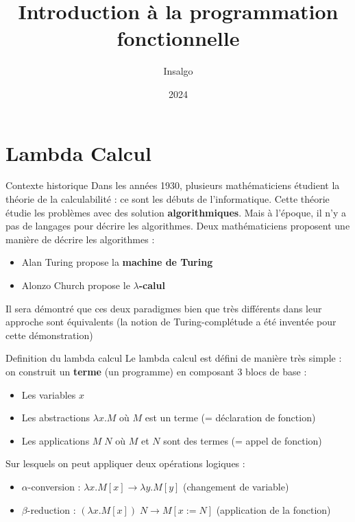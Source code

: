 \documentclass[aspectratio=169]{beamer}
\title{Introduction à la programmation fonctionnelle}
\author{Insalgo}
\date{2024}
\begin{document}
\frame{\titlepage}

\frame{\tableofcontents}

\section{Lambda Calcul}

\begin{frame}{Contexte historique}
    Dans les années 1930, plusieurs mathématiciens étudient la théorie de la calculabilité : ce sont les débuts de l'informatique. Cette théorie étudie les problèmes avec des solution \textbf{algorithmiques}.
    Mais à l'époque, il n'y a pas de langages pour décrire les algorithmes. Deux mathématiciens proposent une manière de décrire les algorithmes :
    \begin{itemize}
        \item Alan Turing propose la \textbf{machine de Turing}
        \item Alonzo Church propose le \textbf{$\lambda$-calul}
    \end{itemize}
    Il sera démontré que ces deux paradigmes bien que très différents dans leur approche sont équivalents (la notion de Turing-complétude a été inventée pour cette démonstration)
\end{frame}

\begin{frame}{Definition du lambda calcul}
    Le lambda calcul est défini de manière très simple : on construit un \textbf{terme} (un programme) en composant 3 blocs de base :
    \begin{itemize}
        \item Les variables $x$
        \item Les abstractions $\lambda x.M$ où $M$ est un terme (= déclaration de fonction)
        \item Les applications $M\;N$ où $M$ et $N$ sont des termes (= appel de fonction)
    \end{itemize}
    Sur lesquels on peut appliquer deux opérations logiques :
    \begin{itemize}
        \item $\alpha$-conversion : $\lambda x.M[x] \rightarrow \lambda y.M[y]$ (changement de variable)
        \item $\beta$-reduction : $(\lambda x.M[x])\;N \rightarrow M[x:=N]$ (application de la fonction)
    \end{itemize}
\end{frame}
\end{document}
